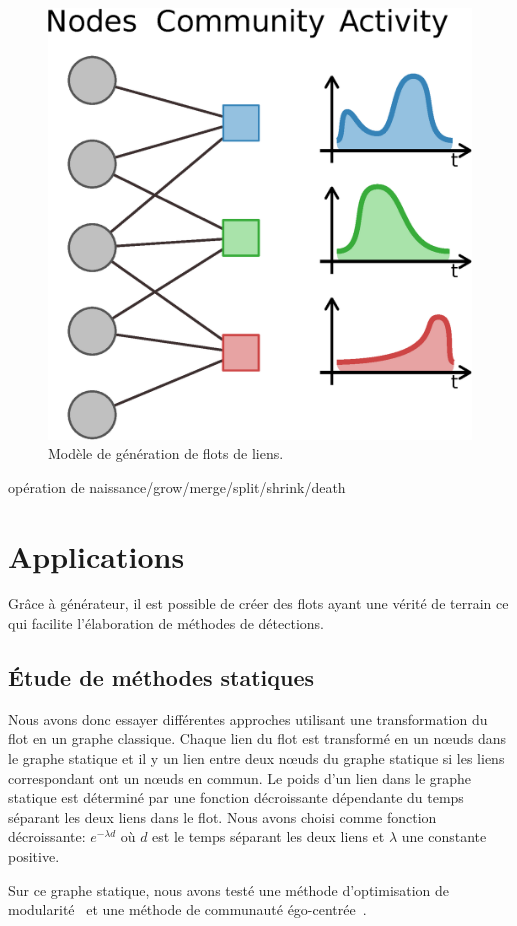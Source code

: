 \begin{figure}
\centering
\includegraphics[width=0.5\linewidth]{img/Qualite/Generator}
\caption{Modèle de génération de flots de liens.}
\label{fig:qualite_Generator}
\end{figure}

opération de naissance/grow/merge/split/shrink/death

\section{Applications}
\label{sec:versqualite_Applications}

Grâce à générateur, il est possible de créer des flots ayant une vérité de terrain ce qui facilite l'élaboration de méthodes de détections.


\subsection{Étude de méthodes statiques}
\label{sec:versqualite_statique}
Nous avons donc essayer différentes approches utilisant une transformation du flot en un graphe classique.
Chaque lien du flot est transformé en un n\oe uds dans le graphe statique et il y un lien entre deux n\oe uds du graphe statique si les liens correspondant ont un n\oe uds en commun.
Le poids d'un lien dans le graphe statique est déterminé par une fonction décroissante dépendante du temps séparant les deux liens dans le flot.
Nous avons choisi comme fonction décroissante: $e^{-\lambda d}$ où $d$ est le temps séparant les deux liens et $\lambda$ une constante positive.

Sur ce graphe statique, nous avons testé une méthode d'optimisation de modularité~\cite{Blondel2008a} et une méthode de communauté égo-centrée~\cite{Danisch2012}.

